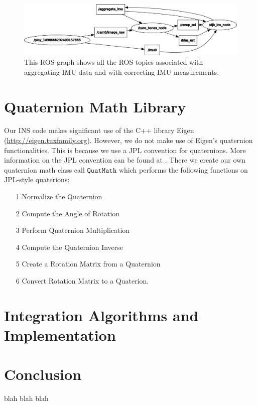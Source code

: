 \documentclass[11pt,a4paper]{article}
\begin{document}
\begin{figure}
	\centering
	\includegraphics[scale=0.42]{withonlinebias}
	\caption{This ROS graph shows all the ROS topics associated with aggregating IMU data and with correcting IMU measurements.}
	\label{fig:withonlinebias}
\end{figure}

\section{Quaternion Math Library}

Our INS code makes significant use of the C++ library Eigen (\url{http://eigen.tuxfamily.org}). However, we do not make use of Eigen's quaternion functionalities. This is because we use a JPL convention for quaternions. More information on the JPL convention can be found at \cite{Trawny:2005,Barfoot:2011,Wie:2008}. There we create our own quaternion math class call $\texttt{QuatMath}$ which performs the following functions on JPL-style quaterions:
\begin{itemize}
	\item[1] Normalize the Quaternion
	\item[2] Compute the Angle of Rotation
	\item[3] Perform Quaternion Multiplication
	\item[4] Compute the Quaternion Inverse
	\item[5] Create a Rotation Matrix from a Quaternion
	\item[6] Convert Rotation Matrix to a Quaterion.
\end{itemize}

\section{Integration Algorithms and Implementation}

\section{Conclusion}

blah blah blah \cite{Forster:2017,Forster:2015,Eckenhoff:2016}



\end{document}
